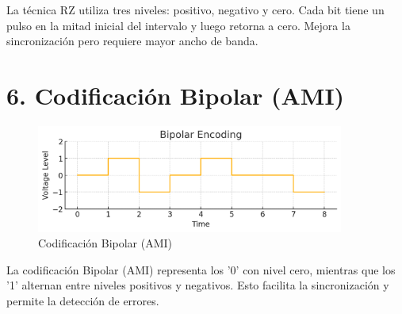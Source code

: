 \documentclass[a4paper,12pt]{article}
\begin{document}
La técnica RZ utiliza tres niveles: positivo, negativo y cero. Cada bit tiene un pulso en la mitad inicial del intervalo y luego retorna a cero. Mejora la sincronización pero requiere mayor ancho de banda.

\clearpage

\section*{6. Codificación Bipolar (AMI)}

\begin{figure}[h!]
\centering
\includegraphics[width=0.9\textwidth]{bipolar_v2.png}
\caption{Codificación Bipolar (AMI)}
\end{figure}

La codificación Bipolar (AMI) representa los '0' con nivel cero, mientras que los '1' alternan entre niveles positivos y negativos. Esto facilita la sincronización y permite la detección de errores.
\end{document}
